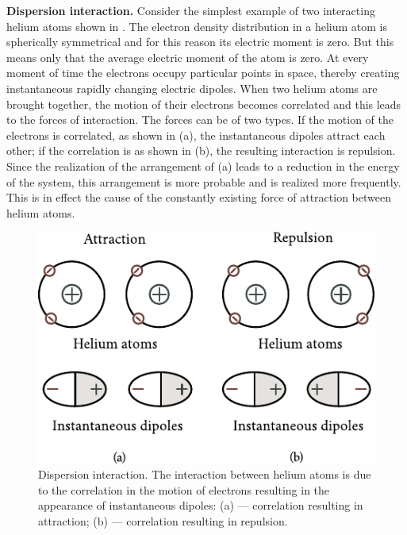 \textbf{Dispersion interaction.} Consider the simplest example of two interacting helium atoms shown in . The electron density distribution in a helium atom is spherically symmetrical and for this reason its electric moment is zero. But this means only that the average electric moment of the atom is zero. At every moment of time the electrons occupy particular points in space, thereby creating instantaneous rapidly changing electric dipoles. When two helium atoms are brought together, the motion of their electrons becomes correlated and this leads to the forces of interaction. The forces can be of two types. If the motion of the electrons is correlated, as shown in (a), the instantaneous dipoles attract each other; if the correlation is as shown in (b), the resulting interaction is repulsion. Since the realization of the arrangement of (a) leads to a reduction in the energy of the system, this arrangement is more probable and is realized more frequently. This is in effect the cause of the constantly existing force of attraction between helium atoms.

\begin{figure}[t]
	\begin{center}
		\includegraphics[scale=1]{figures/ch_01/fig_1_1.pdf}
		\caption[]{Dispersion interaction. The interaction between helium atoms is due to the correlation in the motion of electrons resulting in the appearance of instantaneous dipoles: (a) --- correlation resulting in attraction; (b) --- correlation resulting in repulsion.}
		\label{fig:1_1}
	\end{center}
	\vspace{-0.7cm}
\end{figure}

